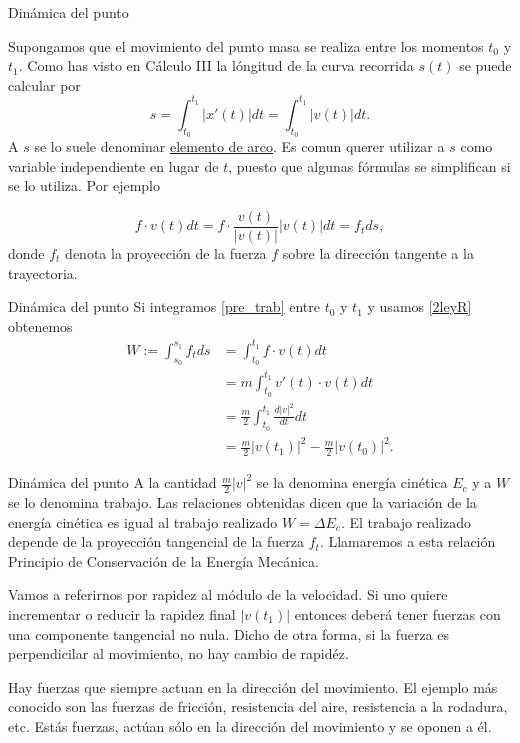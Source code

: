 \documentclass[handout,hyperref={colorlinks=true}]{beamer}
\newcommand{\nl}{\onslide<+-> }
\begin{document}
\begin{frame}{Dinámica del punto}

Supongamos que el movimiento del punto masa se realiza entre los momentos $t_0$ y $t_1$. Como has visto en Cálculo III la lóngitud de la curva recorrida 
$s(t)$ se puede calcular por
\begin{equation}\label{2ley}s=\int_{t_0}^{t_1}|x'(t)|dt=\int_{t_0}^{t_1}|v(t)|dt.\end{equation}
A $s$ se lo suele denominar \href{http://es.wikipedia.org/wiki/Longitud_de_arco}{elemento de arco}. Es comun querer utilizar a $s$ como variable independiente en 
lugar de $t$, puesto que algunas fórmulas se simplifican si se lo utiliza. Por ejemplo

\begin{equation}\label{pre_trab} f\cdot v(t)dt=f\cdot\frac{v(t)}{|v(t)|}|v(t)|dt=f_tds,\end{equation}
donde $f_t$ denota la proyección de la fuerza $f$ sobre la dirección tangente a la trayectoria.




\end{frame}

\begin{frame}{Dinámica del punto}
Si integramos \eqref{pre_trab} entre $t_0$ y $t_1$ y usamos \eqref{2leyR} obtenemos
\[\begin{split} W:=\int_{s_0}^{s_1}f_tds&=\int_{t_0}^{t_1} f\cdot v(t)dt\\
   & =m \int_{t_0}^{t_1} v'(t)\cdot v(t)dt\\
   &=\frac{m}{2} \int_{t_0}^{t_1} \frac{d|v|^2}{dt}dt\\
   &=\frac{m}{2}|v(t_1)|^2-\frac{m}{2}|v(t_0)|^2.  \end{split}\]
\end{frame}


\begin{frame}{Dinámica del punto}
\nl  A la cantidad $\frac{m}{2}|v|^2$ se la denomina energía cinética $E_c$ y a $W$ se lo denomina trabajo. 
Las relaciones obtenidas dicen que la variación de la energía cinética es igual al trabajo realizado $W=\Delta E_c$. 
El trabajo realizado depende de la proyección tangencial de la fuerza $f_t$.  Llamaremos a esta relación
Principio de Conservación de la Energía Mecánica.

\nl  Vamos a referirnos por rapidez al módulo de la velocidad. 
Si uno quiere incrementar o reducir la rapidez final $|v(t_1)|$ entonces deberá tener fuerzas con una componente tangencial no nula. 
Dicho de otra forma, si la fuerza es perpendicilar al movimiento, no hay cambio de rapidéz. 

\nl  Hay fuerzas que siempre actuan en la dirección del movimiento. El ejemplo más conocido son las fuerzas de fricción, resistencia del aire,
resistencia a la rodadura, etc. Estás fuerzas, actúan sólo en la dirección del movimiento y se oponen a él.

\end{frame}
\end{document}
